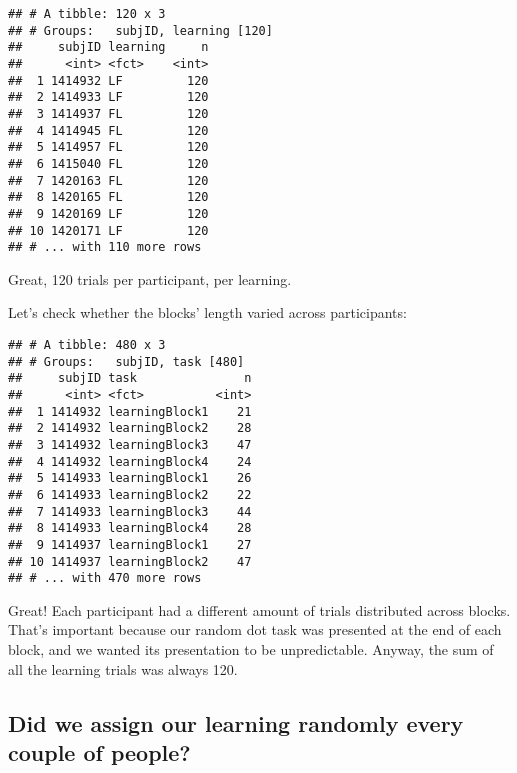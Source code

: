 \documentclass[
]{article}
\newenvironment{Shaded}{\begin{snugshade}}{\end{snugshade}}
\newcommand{\KeywordTok}[1]{\textcolor[rgb]{0.13,0.29,0.53}{\textbf{#1}}}
\newcommand{\NormalTok}[1]{#1}
\newcommand{\OperatorTok}[1]{\textcolor[rgb]{0.81,0.36,0.00}{\textbf{#1}}}
\newcommand{\StringTok}[1]{\textcolor[rgb]{0.31,0.60,0.02}{#1}}
\begin{document}
\begin{verbatim}
## # A tibble: 120 x 3
## # Groups:   subjID, learning [120]
##     subjID learning     n
##      <int> <fct>    <int>
##  1 1414932 LF         120
##  2 1414933 LF         120
##  3 1414937 FL         120
##  4 1414945 FL         120
##  5 1414957 FL         120
##  6 1415040 FL         120
##  7 1420163 FL         120
##  8 1420165 FL         120
##  9 1420169 LF         120
## 10 1420171 LF         120
## # ... with 110 more rows
\end{verbatim}

Great, 120 trials per participant, per learning.

Let's check whether the blocks' length varied across participants:

\begin{Shaded}
\end{Shaded}

\begin{verbatim}
## # A tibble: 480 x 3
## # Groups:   subjID, task [480]
##     subjID task               n
##      <int> <fct>          <int>
##  1 1414932 learningBlock1    21
##  2 1414932 learningBlock2    28
##  3 1414932 learningBlock3    47
##  4 1414932 learningBlock4    24
##  5 1414933 learningBlock1    26
##  6 1414933 learningBlock2    22
##  7 1414933 learningBlock3    44
##  8 1414933 learningBlock4    28
##  9 1414937 learningBlock1    27
## 10 1414937 learningBlock2    47
## # ... with 470 more rows
\end{verbatim}

Great! Each participant had a different amount of trials distributed
across blocks. That's important because our random dot task was
presented at the end of each block, and we wanted its presentation to be
unpredictable. Anyway, the sum of all the learning trials was always
120.

\hypertarget{did-we-assign-our-learning-randomly-every-couple-of-people}{%
\subsection{Did we assign our learning randomly every couple of
people?}\label{did-we-assign-our-learning-randomly-every-couple-of-people}}
\end{document}
